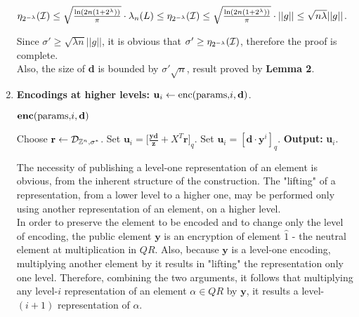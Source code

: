 \begin{enumerate}[label=(\alph*)]
	\begin{center}
		$\eta_{2^{-\lambda}}(\mathcal{I}) \leq \sqrt{\frac{\ln(2n(1 + 2 ^\lambda))}{\pi}} \cdot \lambda_n(L) \leq  \eta_{2^{-\lambda}}(\mathcal{I}) \leq \sqrt{\frac{\ln(2n(1 + 2 ^\lambda))}{\pi}} \cdot ||g|| \leq \sqrt{n\lambda} ||g||$.
	\end{center}

Since $\sigma' \geq \sqrt{\lambda n}||g||$, it is obvious that $\sigma' \geq \eta_{2^{-\lambda}}(\mathcal{I})$, therefore the proof is complete. \\

Also, the size of \textbf{d} is bounded by $\sigma'\sqrt{n}$, result proved by \textbf{Lemma 2}.

\item \textbf{Encodings at higher levels:} $\textbf{u}_i \leftarrow \text{enc(params,}i, \textbf{d})$.

	\begin{tcolorbox}[colframe=black,colback=white,arc=0pt,outer arc=0pt]
	\begin{center}
		$\text{\textbf{enc}(params,}i, \textbf{d})$
	\end{center}
	\begin{algorithmic}[1]
		\State Choose $\textbf{r}\leftarrow \mathcal{D}_{{\mathbb Z}^n, \sigma^*}$.
		\State Set $\textbf{u}_i = \big[ \frac{\textbf{yd}}{\textbf{z}} + X^T\textbf{r}\big]_q$.
		\Else
		\State Set $\textbf{u}_i = [\textbf{d}\cdot \textbf{y}^i]_q$.
		\State \textbf{Output:} \textbf{u}$_i$.
		\EndIf
	\end{algorithmic}
\end{tcolorbox}

The necessity of publishing a level-one representation of an element is obvious, from the inherent structure of the construction. The "lifting" of a representation, from a lower level to a higher one, may be performed only using another representation of an element, on a higher level.\\

In order to preserve the element to be encoded and to change only the level of encoding, the public element $\textbf{y}$ is an encryption of element $\hat{1}$ - the neutral element at multiplication in $QR$. Also, because $\textbf{y}$ is a level-one encoding, multiplying another element by it results in "lifting" the representation only one level. Therefore, combining the two arguments, it follows that multiplying any level-$i$ representation of an element $\alpha \in QR$ by $\textbf{y}$, it results a level-$(i+1)$ representation of $\alpha$.\\


\end{enumerate}
